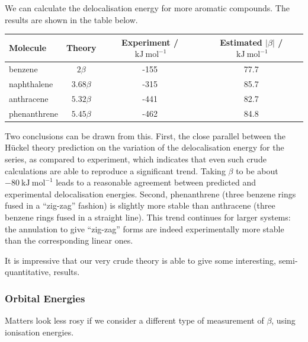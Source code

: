 \documentclass{article}
\theoremstyle{plain}\theoremheaderfont{\normalfont\itshape}\theorembodyfont{\rmfamily}\theoremseparator{.}\newtheorem*{rem}{Remark}\newtheorem*{ex}{Example}\newtheorem*{proof}{Proof}\newtheorem*{altp}{Alternative proof}
\theoremstyle{plain}\theoremheaderfont{\normalfont\bfseries}\theorembodyfont{\rmfamily}\theoremseparator{.}\newtheorem{thm}{Theorem}[section]\newtheorem{lem}[thm]{Lemma}\newtheorem{prop}[thm]{Proposition}\newtheorem*{cor}{Corollary}\newtheorem{defn}[thm]{Definition}\newtheorem{clm}[thm]{Claim}\newtheorem{clminproof}{Claim}\newtheorem{pos}{Postulate}[section]
\theoremstyle{break}\theoremheaderfont{\normalfont\itshape}\theorembodyfont{\rmfamily}\theoremseparator{.\medskip}\newtheorem*{proofskip}{Proof}\newtheorem*{exs}{Examples}\newtheorem*{rems}{Remarks}
\theoremstyle{break}\theoremheaderfont{\normalfont\bfseries}\theorembodyfont{\rmfamily}\theoremseparator{.\medskip}\newtheorem{lemskip}[thm]{Lemma}\newtheorem{defnskip}[thm]{Definition}\newtheorem{propskip}[thm]{Proposition}\newtheorem{thmskip}[thm]{Theorem}
\numberwithin{equation}{section}
\newcommand{\unit}[1]{\ \mathrm{#1}}
\newcommand{\abs}[1]{\left| #1 \right|}
\begin{document}
    We can calculate the delocalisation energy for more aromatic compounds. The results are shown in the table below.
    \renewcommand{\arraystretch}{1.2}
    \begin{table}[ht!]
        \centering
        \begin{tabular}{lccc}
            \toprule
            Molecule & Theory & Experiment / \(\!\unit{kJ}\unit{mol}^{-1}\) & Estimated \(\abs{\beta}\) / \(\!\unit{kJ}\unit{mol}^{-1}\) \\ \midrule
            benzene & \(2\beta\) & -155 & 77.7 \\
            naphthalene & \(3.68\beta\) & -315 & 85.7 \\
            anthracene & \(5.32\beta\) & -441 & 82.7 \\
            phenanthrene & \(5.45\beta\) & -462 & 84.8 \\ \bottomrule
        \end{tabular}
    \end{table}

    Two conclusions can be drawn from this. First, the close parallel between the H\"{u}ckel theory prediction on the variation of the delocalisation energy for the series, as compared to experiment, which indicates that even such crude calculations are able to reproduce a significant trend. Taking \(\beta\) to be about \(-80\unit{kJ}\unit{mol}^{-1}\) leads to a reasonable agreement between predicted and experimental delocalisation energies. Second, phenanthrene (three benzene rings fused in a ``zig-zag'' fashion) is slightly more stable than anthracene (three benzene rings fused in a straight line). This trend continues for larger systems: the annulation to give “zig-zag” forms are indeed experimentally more stable than the corresponding linear ones.

    It is impressive that our very crude theory is able to give some interesting, semi-quantitative, results.

    \subsubsection{Orbital Energies}
    Matters look less rosy if we consider a different type of measurement of \(\beta\), using ionisation energies.
\end{document}
